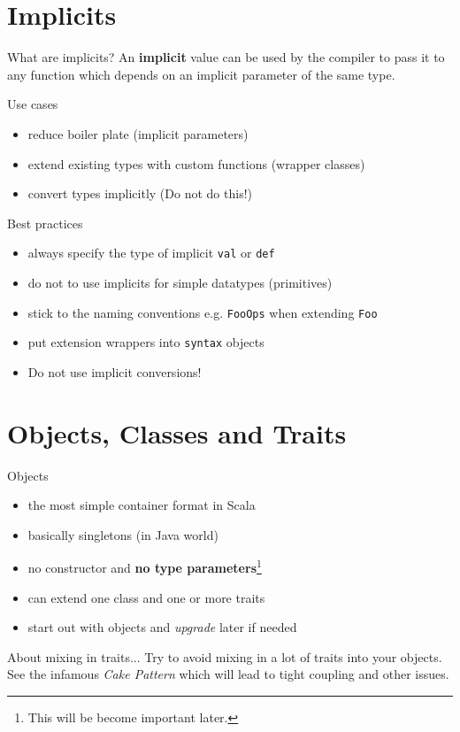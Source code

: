 \documentclass[10pt]{beamer}
\begin{document}
  \section{Implicits}
  \begin{frame}{What are implicits?}
    An \textbf{implicit} value can be used by the compiler to pass it to any
    function which depends on an implicit parameter of the same type.
  \end{frame}

  \begin{frame}{Use cases}
    \begin{itemize}
      \item reduce boiler plate (implicit parameters)
      \item extend existing types with custom functions (wrapper classes)
      \item convert types implicitly (\alert{Do not do this!})
    \end{itemize}
  \end{frame}

  \begin{frame}{Best practices}
    \begin{itemize}
      \item always specify the type of implicit \texttt{val} or \texttt{def}
      \item do not to use implicits for simple datatypes (primitives)
      \item stick to the naming conventions e.g. \texttt{FooOps} when extending \texttt{Foo}
      \item put extension wrappers into \texttt{syntax} objects
      \item \alert{Do not use implicit conversions!}
    \end{itemize}
  \end{frame}

  \section{Objects, Classes and Traits}
  \begin{frame}{Objects}
    \begin{itemize}
      \item the most simple container format in Scala
      \item basically singletons (in Java world)
      \item no constructor and \textbf{no type parameters}\footnote{This will be become important later.}
      \item can extend one class and one or more traits
      \item start out with objects and \textit{upgrade} later if needed
    \end{itemize}
    \begin{alertblock}{About mixing in traits...}
      Try to avoid mixing in a lot of traits into your objects. See the infamous \textit{Cake Pattern} which will lead to tight coupling and other issues.
    \end{alertblock}
  \end{frame}
\end{document}
